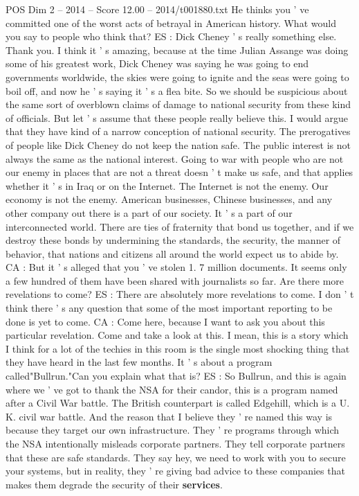 \begin{textsample}{POS Dim 2 – 2014 – Score 12.00 – 2014/t001880.txt}
He thinks you ' ve committed one of the worst acts of betrayal in American history.
What would you say to people who think that?
ES : Dick Cheney ' s really something else.
Thank you.
I think it ' s amazing, because at the time Julian Assange was doing some of his greatest work, Dick Cheney was saying he was going to end governments worldwide, the skies were going to ignite and the seas were going to boil off, and now he ' s saying it ' s a flea bite.
So we should be suspicious about the same sort of overblown claims of damage to national security from these kind of officials.
But let ' s assume that these people really believe this.
I would argue that they have kind of a narrow conception of national security.
The prerogatives of people like Dick Cheney do not keep the nation safe.
The public interest is not always the same as the national interest.
Going to war with people who are not our enemy in places that are not a threat doesn ' t make us safe, and that applies whether it ' s in Iraq or on the Internet.
The Internet is not the enemy.
Our economy is not the enemy.
American businesses, Chinese businesses, and any other company out there is a part of our society.
It ' s a part of our interconnected world.
There are ties of fraternity that bond us together, and if we destroy these bonds by undermining the standards, the security, the manner of behavior, that nations and citizens all around the world expect us to abide by.
CA : But it ' s alleged that you ' ve stolen 1. 7 million documents.
It seems only a few hundred of them have been shared with journalists so far.
Are there more revelations to come?
ES : There are absolutely more revelations to come.
I don ' t think there ' s any question that some of the most important reporting to be done is yet to come.
CA : Come here, because I want to ask you about this particular revelation.
Come and take a look at this.
I mean, this is a story which I think for a lot of the techies in this room is the single most shocking thing that they have heard in the last few months.
It ' s about a program called"Bullrun."Can you explain what that is?
ES : So Bullrun, and this is again where we ' ve got to thank the NSA for their candor, this is a program named after a Civil War battle.
The British counterpart is called Edgehill, which is a U.
K. civil war battle.
And the reason that I believe they ' re named this way is because they target our own infrastructure.
They ' re programs through which the NSA intentionally misleads corporate partners.
They tell corporate partners that these are safe standards.
They say hey, we need to work with you to secure your systems, but in reality, they ' re giving bad advice to these companies that makes them degrade the security of their \textbf{services}.

\end{textsample}
